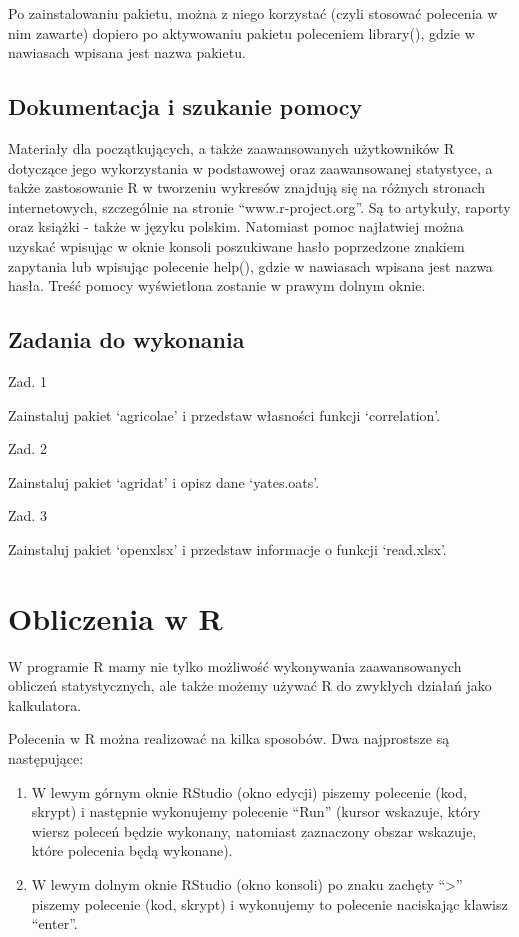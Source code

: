 \documentclass[12pt,B5paper,]{book}
\providecommand{\tightlist}{%
  \setlength{\itemsep}{0pt}\setlength{\parskip}{0pt}}
\begin{document}
Po zainstalowaniu pakietu, można z niego korzystać (czyli stosować
polecenia w nim zawarte) dopiero po aktywowaniu pakietu poleceniem
library(), gdzie w nawiasach wpisana jest nazwa pakietu.

\section{Dokumentacja i szukanie
pomocy}\label{dokumentacja-i-szukanie-pomocy}

Materiały dla początkujących, a także zaawansowanych użytkowników R
dotyczące jego wykorzystania w podstawowej oraz zaawansowanej
statystyce, a także zastosowanie R w tworzeniu wykresów znajdują się na
różnych stronach internetowych, szczególnie na stronie
``www.r-project.org''. Są to artykuły, raporty oraz książki - także w
języku polskim. Natomiast pomoc najłatwiej można uzyskać wpisując w
oknie konsoli poszukiwane hasło poprzedzone znakiem zapytania lub
wpisując polecenie help(), gdzie w nawiasach wpisana jest nazwa hasła.
Treść pomocy wyświetlona zostanie w prawym dolnym oknie.

\section{Zadania do wykonania}\label{zadania-do-wykonania}

Zad. 1

Zainstaluj pakiet `agricolae' i przedstaw własności funkcji
`correlation'.

Zad. 2

Zainstaluj pakiet `agridat' i opisz dane `yates.oats'.

Zad. 3

Zainstaluj pakiet `openxlsx' i przedstaw informacje o funkcji
`read.xlsx'.

\chapter{Obliczenia w R}\label{obliczenia-w-r}

W programie R mamy nie tylko możliwość wykonywania zaawansowanych
obliczeń statystycznych, ale także możemy używać R do zwykłych działań
jako kalkulatora.

Polecenia w R można realizować na kilka sposobów. Dwa najprostsze są
następujące:

\begin{enumerate}
\def\labelenumi{\arabic{enumi}.}
\tightlist
\item
  W lewym górnym oknie RStudio (okno edycji) piszemy polecenie (kod,
  skrypt) i następnie wykonujemy polecenie ``Run'' (kursor wskazuje,
  który wiersz poleceń będzie wykonany, natomiast zaznaczony obszar
  wskazuje, które polecenia będą wykonane).
\item
  W lewym dolnym oknie RStudio (okno konsoli) po znaku zachęty
  ``\textgreater{}'' piszemy polecenie (kod, skrypt) i wykonujemy to
  polecenie naciskając klawisz ``enter''.
\end{enumerate}
\end{document}
